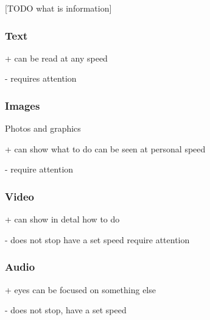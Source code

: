 [TODO what is information]

\subsubsection{Text}

+
can be read at any speed

-
requires attention

\subsubsection{Images}
Photos and graphics

+
can show what to do
can be seen at personal speed

-
require attention

\subsubsection{Video}

+
can show in detal how to do

-
does not stop have a set speed
require attention

\subsubsection{Audio}

+
eyes can be focused on something else

-
does not stop, have a set speed